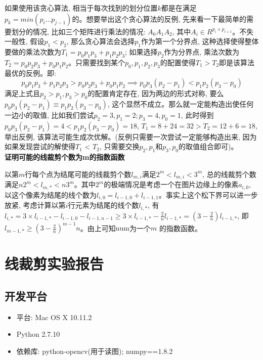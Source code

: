 \documentclass[paper=a4, fontsize=11pt]{scrartcl} %
\numberwithin{equation}{section} %
\numberwithin{figure}{section} %
\numberwithin{table}{section} %
\begin{document}
如果使用该贪心算法, 相当于每次找到的划分位置$k$都是在满足$p_k = min(p_i ... p_{j-1})$的。想要举出这个贪心算法的反例, 先来看一下最简单的需要划分的情况, 比如三个矩阵进行乘法的情况: $A_0A_1A_2$, 其中$A_i \in R^{p_i \times p_{i+1}}$。不失一般性, 假设$p_1 < p_2$, 那么贪心算法会选择$p_1$作为第一个分界点, 这种选择使得整体要做的乘法次数为$T_1 = p_0p_1p_3 + p_1p_2p_3$; 如果选择$p_2$作为分界点, 乘法次数为$T_2 = p_0p_2p_3 + p_0p_1p_2$。只需要找到某个$p_0, p_1, p_2, p_3$的配置使得$T_1 > T_2$即是该算法最优的反例。即:
\[
p_0p_1p_3 + p_1p_2p_3 > p_0p_2p_3 + p_0p_1p_2 \implies p_0p_3(p_2-p_1) < p_1p_2(p_3-p_0)
\]
满足上式且$p_2 > p_1, p_3 > p_0$的配置肯定存在, 因为两边的形式对称, 要么$p_0p_3(p_2 - p_1) \equiv p_1p_2(p_3-p_0)$, 这个显然不成立。那么就一定能构造出使任何一边小的取值, 比如我们尝试$p_2 = 3, p_1 = 2; p_3 = 4, p_0 = 1$, 此时得到$p_0p_3(p_2-p_1) = 4 < p_1p_2(p_3-p_0)=18$, $T_1 = 8 + 24 = 32 > T_2 = 12 + 6 = 18$, 举出反例, 该算法可能生成次优解。(反例只需要一次尝试一定能够构造出来, 因为如果发现尝试的解使得$T_1$ < $T_2$, 只需要交换$p_2, p_1$和$p_3, p_0$的取值组合即可)。
\\[4ex]

\textbf{证明可能的线裁剪个数为m的指数函数}

以第$m$行每个点为结尾可能的线裁剪个数$l_{m, i}$满足$2^m < l_{m, i} < 3^m$, 总的线裁剪个数满足$n2^m < l_{m, *} < n3^m$。其中$2^m$的极端情况是考虑一个在图片边缘上的像素$a_{i, 0}$, 以这个像素为结尾的线个数为$l_{i, 0} = l_{i-1, 0} + l_{i-1, 1}$。事实上这个松下界可以进一步放紧, 考虑计算以第$i$行元素为结尾的线个数$l_{i, *}$, 有$l_{i, *} = 3 \times l_{i-1,*} - l_{i-1,0} - l_{i-1,n-1} \geq 3 \times l_{i-1,*} - \frac{2}{n}l_{i-1,*} = (3-\frac{2}{n})l_{i-1,*}$, 即$l_{m-1, *}\geq (3-\frac{2}{n})^{m-1}n$。由上可知$\mbox{num}$为一个$m$ 的指数函数。

\section {线裁剪实验报告}

\subsection{开发平台}

\begin{itemize}
\item 平台: Mac OS X 10.11.2
\item Python 2.7.10
\item 依赖库: python-opencv(用于读图); numpy==1.8.2
\end{itemize}
\end{document}

